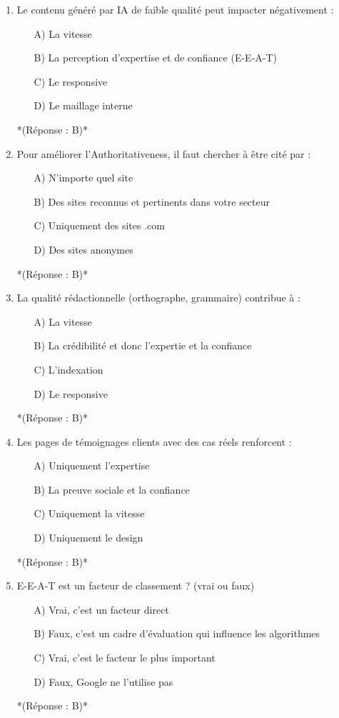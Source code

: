 \documentclass[12pt,a4paper,twoside]{report}
\begin{document}
\begin{enumerate}
\item Le contenu généré par IA de faible qualité peut impacter négativement :
\begin{itemize}
\item[A)] La vitesse
\item[B)] La perception d'expertise et de confiance (E-E-A-T)
\item[C)] Le responsive
\item[D)] Le maillage interne
\end{itemize}
*(Réponse : B)*

\item Pour améliorer l'Authoritativeness, il faut chercher à être cité par :
\begin{itemize}
\item[A)] N'importe quel site
\item[B)] Des sites reconnus et pertinents dans votre secteur
\item[C)] Uniquement des sites .com
\item[D)] Des sites anonymes
\end{itemize}
*(Réponse : B)*

\item La qualité rédactionnelle (orthographe, grammaire) contribue à :
\begin{itemize}
\item[A)] La vitesse
\item[B)] La crédibilité et donc l'expertie et la confiance
\item[C)] L'indexation
\item[D)] Le responsive
\end{itemize}
*(Réponse : B)*

\item Les pages de témoignages clients avec des cas réels renforcent :
\begin{itemize}
\item[A)] Uniquement l'expertise
\item[B)] La preuve sociale et la confiance
\item[C)] Uniquement la vitesse
\item[D)] Uniquement le design
\end{itemize}
*(Réponse : B)*

\item E-E-A-T est un facteur de classement ? (vrai ou faux)
\begin{itemize}
\item[A)] Vrai, c'est un facteur direct
\item[B)] Faux, c'est un cadre d'évaluation qui influence les algorithmes
\item[C)] Vrai, c'est le facteur le plus important
\item[D)] Faux, Google ne l'utilise pas
\end{itemize}
*(Réponse : B)*


\end{enumerate}
\end{document}
